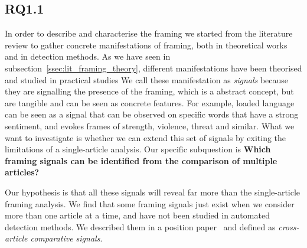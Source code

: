 \subsection{RQ1.1}
In order to describe and characterise the framing we started from the literature review to gather concrete manifestations of framing, both in theoretical works and in detection methods.
As we have seen in subsection~\ref{ssec:lit_framing_theory}, different manifestations have been theorised and studied in practical studies
We call these manifestation as \emph{signals} because they are signalling the presence of the framing, which is a abstract concept, but are tangible and can be seen as concrete features.
For example, loaded language can be seen as a signal that can be observed on specific words that have a strong sentiment, and evokes frames of strength, violence, threat and similar.
What we want to investigate is whether we can extend this set of signals by exiting the limitations of a single-article analysis. 
Our specific subquestion is \textbf{Which framing signals can be identified from the comparison of multiple articles?}

Our hypothesis is that all these signals will reveal far more than the single-article framing analysis.
We find that some framing signals just exist when we consider more than one article at a time, and have not been studied in automated detection methods.
We described them in a position paper~\cite{mensio2020towards} and defined as \emph{cross-article comparative signals}.

    
